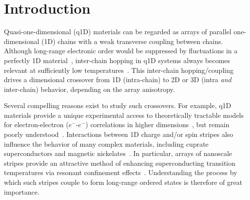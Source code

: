 \documentclass[prb,twocolumn,showpacs,preprintnumbers,amsmath,amssymb,floatfix,groupedaddress,superscriptaddress,aps,10pt]{revtex4-1}
\begin{document}
\maketitle

\section{Introduction}

Quasi-one-dimensional (q1D) materials can be regarded as arrays of parallel one-dimensional (1D) chains with a weak transverse coupling between chains.  Although long-range electronic order would be suppressed by fluctuations in a perfectly 1D material~\cite{Mermin1966,Hohenberg1967}, inter-chain hopping in q1D systems always becomes relevant at sufficiently low temperatures~\cite{Efetov1975,Scalapino1975,Gor'kov1975}.  This inter-chain hopping/coupling drives a dimensional crossover from 1D (intra-chain) to 2D or 3D (intra \emph{and} inter-chain) behavior, depending on the array anisotropy. 


Several compelling reasons exist to study such crossovers.  For example, q1D materials provide a unique experimental access to theoretically tractable models for electron-electron ($e^-$-$e^-$) correlations in higher dimensions~\cite{Gogolin1998}, but remain poorly understood~\cite{Carr2003a}. Interactions between 1D charge and/or spin stripes also influence the behavior of many complex materials, including cuprate superconductors and magnetic nickelates~\cite{Vojta2006,Anissimova2014,Comin2015}. In particular, arrays of nanoscale stripes provide an attractive method of enhancing superconducting transition temperatures via resonant confinement effects~\cite{Perali1996,Bianconi1997}. Understanding the process by which such stripes couple to form long-range ordered states is therefore of great importance.
\end{document}

